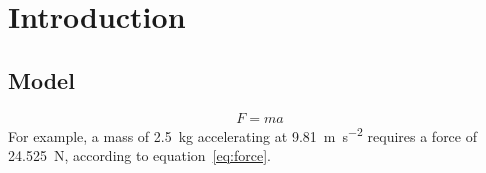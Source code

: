 \section{Introduction}
\label{sec:introduction}
\lipsum[1]

\subsection{Model}
\lipsum[2][1-3]
\begin{equation}
    F = ma
    \label{eq:force}
\end{equation}
For example, a mass of \qty{2.5}{\kilogram} accelerating at
\qty{9.81}{\meter\per\second\squared} requires a force of
\qty{24.525}{\newton}, according to equation~\eqref{eq:force}.
